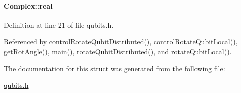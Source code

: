\paragraph[{\texorpdfstring{real}{real}}]{ Complex\+::real}\hypertarget{structComplex_a479ad939835457595fcca3ca55c06283}{}\label{structComplex_a479ad939835457595fcca3ca55c06283}


Definition at line 21 of file qubits.\+h.



Referenced by control\+Rotate\+Qubit\+Distributed(), control\+Rotate\+Qubit\+Local(), get\+Rot\+Angle(), main(), rotate\+Qubit\+Distributed(), and rotate\+Qubit\+Local().



The documentation for this struct was generated from the following file\+:\begin{DoxyCompactItemize}
\item 
\hyperlink{qubits_8h}{qubits.\+h}\end{DoxyCompactItemize}
